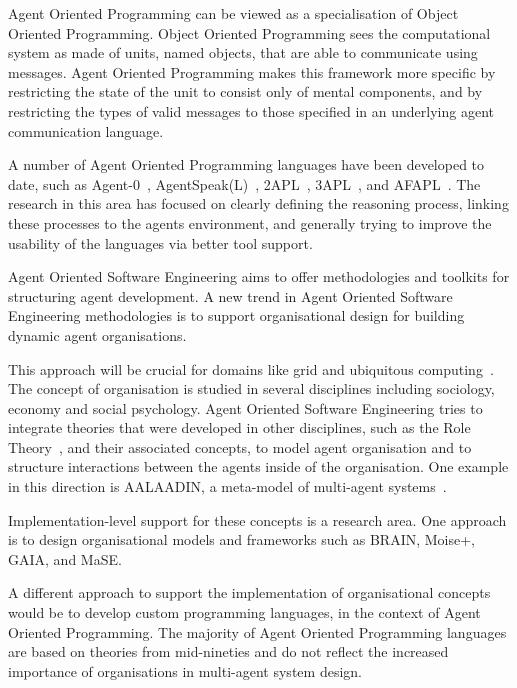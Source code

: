 \documentclass[a4paper,12pt,oneside,fleqn]{book} %
\begin{document}
Agent Oriented Programming can be viewed as a specialisation of Object
Oriented Programming\null. Object Oriented Programming sees the
computational system as made of units, named objects, that are able to
communicate using messages. Agent Oriented Programming makes this framework
more specific by restricting the state of the unit to consist only of
mental components, and by restricting the types of valid messages to those
specified in an underlying agent communication language.

A number of Agent Oriented Programming languages have been developed to
date, such as Agent-0~\cite{DBLP:journals/ai/Shoham93},
AgentSpeak(L)~\cite{DBLP:conf/maamaw/Rao96},
2APL~\cite{DBLP:journals/aamas/Dastani08},
3APL~\cite{DBLP:conf/promas/DastaniRDM03}, and
AFAPL~\cite{DBLP:conf/seke/CollierOR04}. The research in this area has
focused on clearly defining the reasoning process, linking these processes
to the agents environment, and generally trying to improve the usability of
the languages via better tool support.

Agent Oriented Software Engineering aims to offer methodologies and
toolkits for structuring agent development. A new trend in Agent Oriented
Software Engineering methodologies is to support organisational design for
building dynamic agent organisations.

This approach will be crucial for domains like grid and ubiquitous
computing~\cite{luck2005agent}. The concept of organisation is studied in
several disciplines including sociology, economy and social psychology.
Agent Oriented Software Engineering tries to integrate theories that were
developed in other disciplines, such as the Role
Theory~\cite{biddle1986recent}, and their associated concepts, to model
agent organisation and to structure interactions between the agents inside
of the organisation. One example in this direction is AALAADIN, a
meta-model of multi-agent systems~\cite{ferber1998meta}.

Implementation-level support for these concepts is a research area. One
approach is to design organisational models and frameworks such as BRAIN, Moise+, GAIA, and MaSE.

A different approach to support the implementation of organisational
concepts would be to develop custom programming languages, in the context
of Agent Oriented Programming. The majority of Agent Oriented Programming
languages are based on theories from mid-nineties and do not reflect the
increased importance of organisations in multi-agent system design.
\end{document}
